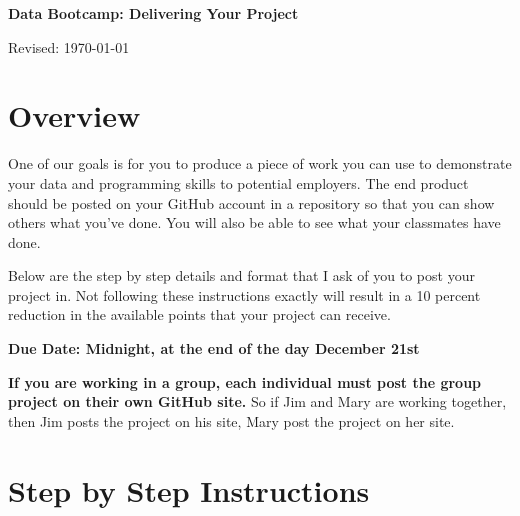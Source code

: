 


\pagestyle{headandfoot}
\runningheadrule
\firstpageheadrule
{}
\runningfooter{}{}{}



\bigskip\bigskip
\centerline{\Large \bf Data Bootcamp:  Delivering Your Project}
\centerline{Revised: \today}

\section*{Overview}

One of our goals is for you to produce a piece of work you can use to demonstrate your data and programming skills to potential employers. The end product should be posted on your GitHub account in a repository so that
you can show others what you've done. You will also be able to see what your classmates have done.

Below are the step by step details and format that I ask of you to post your project in. Not following these instructions exactly will result in a 10 percent reduction in the available points that your project can receive.

\textbf{Due Date: Midnight, at the end of the day December 21st}

\textbf{If you are working in a group, each individual must post the group project on their own GitHub site.} So if Jim and Mary are working together, then Jim posts the project on his site, Mary post the project on her site.

\section*{Step by Step Instructions}

